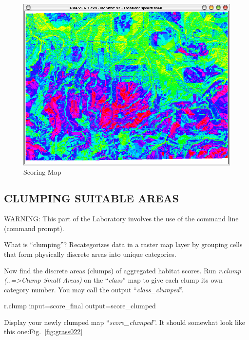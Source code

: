 \begin{figure}[htbp]
   \centering
   \includegraphics[scale=0.35]{grass021.png}
   \caption{Scoring Map}
   \label{fig:grass021}
\end{figure}

\subsection{CLUMPING SUITABLE AREAS}
WARNING: This part of the Laboratory involves the use of the command line (command prompt).

What is ``clumping''?
Recategorizes data in a raster map layer by grouping cells that form physically discrete areas into unique categories.

Now find the discrete areas (clumps) of aggregated habitat scores. 
Run \textit{r.clump (..=>Clump Small Areas) }on the ``\textit{class}'' map to give each clump its own category number. You may call the output ``\textit{class\_clumped}''.

\begin{smallverbatim}
r.clump input=score_final output=score_clumped 
\end{smallverbatim}

Display your newly clumped map ``\textit{score\_clumped}''. It should somewhat look like this one:Fig.~\ref{fig:grass022}

